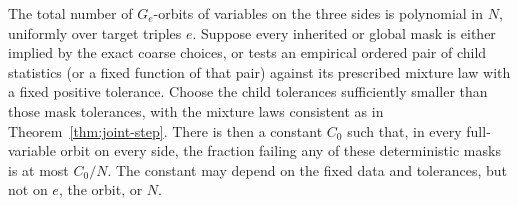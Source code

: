\begin{lemma}
\label{lem:orbit-masks}
The total number of $G_e$-orbits of variables on the three sides is
polynomial in $N$, uniformly over target triples $e$.
Suppose every inherited or global mask is either implied by the exact
coarse choices, or tests an empirical ordered pair of child statistics
(or a fixed function of that pair) against its prescribed mixture law
with a fixed positive tolerance.
Choose the child tolerances sufficiently smaller than those mask
tolerances, with the mixture laws consistent as in
Theorem~\ref{thm:joint-step}.  There is then a constant $C_0$ such that,
in every full-variable orbit on every side, the fraction failing any
of these deterministic masks is at most $C_0/N$.
The constant may depend on the fixed data and tolerances, but not on
$e$, the orbit, or $N$.
\end{lemma}

